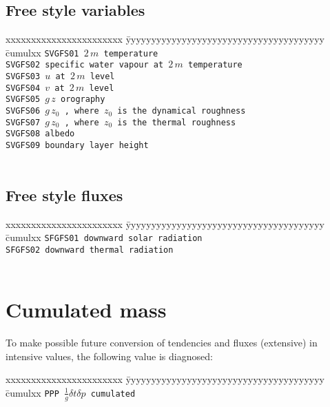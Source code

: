 \subsection{Free style variables}


\begin{tabbing}
xxxxxxxxxxxxxxxxxxxxxxx \= yyyyyyyyyyyyyyyyyyyyyyyyyyyyyyyyyyyyyyy \= cumulxx \kill
\tt SVGFS01 \>  $2 \, m$ temperature \\[1ex]
\tt SVGFS02 \>  specific water vapour at $2 \, m$ temperature \\[1ex]
\tt SVGFS03 \>  $u$ at $2 \, m$ level \\[1ex]
\tt SVGFS04 \>  $v$ at $2 \, m$ level \\[1ex]
\tt SVGFS05 \>  $g \, z$ orography \\[1ex]
\tt SVGFS06 \>  $g \, z_0$ , where $z_0$ is the dynamical roughness \\[1ex]
\tt SVGFS07 \>  $g \, z_0$ , where $z_0$ is the thermal roughness \\[1ex]
\tt SVGFS08 \>  albedo \\[1ex]
\tt SVGFS09 \>  boundary layer height \\[1ex]
\\[1ex]
\end{tabbing}


\subsection{Free style fluxes}

\begin{tabbing}
xxxxxxxxxxxxxxxxxxxxxxx \= yyyyyyyyyyyyyyyyyyyyyyyyyyyyyyyyyyyyyyy \= cumulxx \kill
\tt SFGFS01 \>  downward solar radiation \\[1ex]
\tt SFGFS02 \>  downward thermal radiation \\[1ex]
\\[1ex]
\end{tabbing}

\section{Cumulated mass}

To make possible future conversion of tendencies and fluxes (extensive) in intensive values, the following value is diagnosed:
\begin{tabbing}
xxxxxxxxxxxxxxxxxxxxxxx \= yyyyyyyyyyyyyyyyyyyyyyyyyyyyyyyyyyyyyyy \= cumulxx \kill
\tt PPP \> $\frac{1}{g}\delta t \delta p$ \> cumulated\\[1ex]
\end{tabbing}

